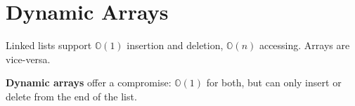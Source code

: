 \documentclass[12pt]{article}
\begin{document}
\section{Dynamic Arrays}
Linked lists support $\mathbb{O}(1)$ insertion and deletion, $\mathbb{O}(n)$ accessing. Arrays are vice-versa.

{\bf Dynamic arrays} offer a compromise: $\mathbb{O}(1)$ for both, but can only insert or delete from the end of the list.
\end{document}
